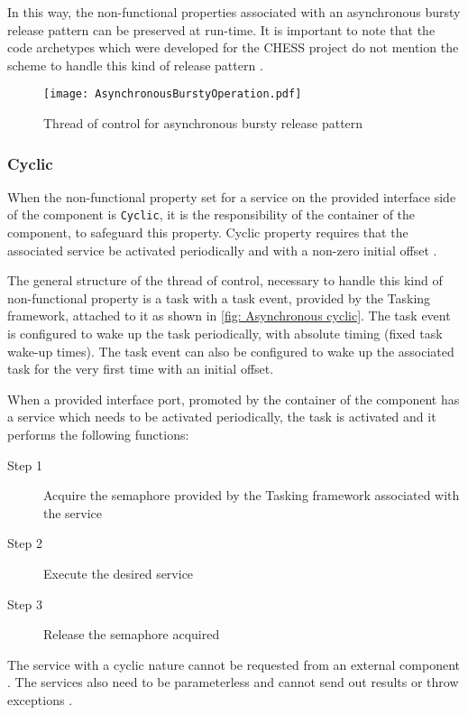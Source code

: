 In this way, the non-functional properties associated with an asynchronous bursty release pattern can be preserved at run-time. It is important to note that the code archetypes which were developed for the CHESS project do not mention the scheme to handle this kind of release pattern \cite{CharEvoRAVCodeAr,EvoRAVCodeAr}.

\begin{figure}[h]
	\centering
	\texttt{[image: AsynchronousBurstyOperation.pdf]}
	\caption{Thread of control for asynchronous bursty release pattern}
	\label{fig: Asynchronous bursty}
\end{figure}

\subsubsection{\textbf{Cyclic}} 
When the non-functional property set for a service on the provided interface side of the component is \texttt{Cyclic}, it is the responsibility of the container of the component, to safeguard this property. Cyclic property requires that the associated service be activated periodically and with a non-zero initial offset \cite{SpecMetamodel,CompBasedProcess}. 

The general structure of the thread of control, necessary to handle this kind of non-functional property is a task with a task event, provided by the Tasking framework, attached to it as shown in \cref{fig: Asynchronous cyclic}. The task event is configured to wake up the task periodically, with absolute timing (fixed task wake-up times). The task event can also be configured to wake up the associated task for the very first time with an initial offset.

When a provided interface port, promoted by the container of the component has a service which needs to be activated periodically, the task is activated and it performs the following functions:

\begin{description}
\item [Step 1] Acquire the semaphore provided by the Tasking framework associated with the service
\item [Step 2] Execute the desired service
\item [Step 3] Release the semaphore acquired 
\end{description}    

The service with a cyclic nature cannot be requested from an external component \cite{SpecMetamodel}. The services also need to be parameterless and cannot send out results or throw exceptions \cite{SpecMetamodel}. 

